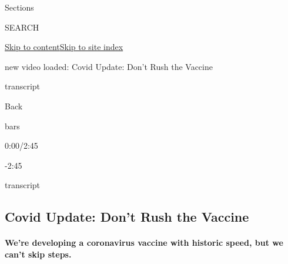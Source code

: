 Sections

SEARCH

\protect\hyperlink{site-content}{Skip to
content}\protect\hyperlink{site-index}{Skip to site index}

new video loaded: Covid Update: Don't Rush the Vaccine

transcript

Back

bars

0:00/2:45

-2:45

transcript

\hypertarget{covid-update-dont-rush-the-vaccine}{%
\subsection{Covid Update: Don't Rush the
Vaccine}\label{covid-update-dont-rush-the-vaccine}}

\hypertarget{were-developing-a-coronavirus-vaccine-with-historic-speed-but-we-cant-skip-steps}{%
\paragraph{We're developing a coronavirus vaccine with historic speed,
but we can't skip
steps.}\label{were-developing-a-coronavirus-vaccine-with-historic-speed-but-we-cant-skip-steps}}

